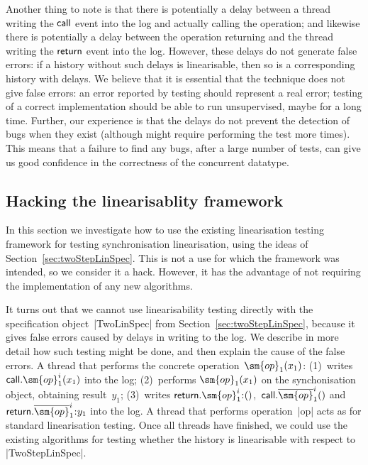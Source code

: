 Another thing to note is that there is potentially a delay between a thread
writing the $\mathsf{call}$ event into the log and actually calling the operation; and
likewise there is potentially a delay between the operation returning and the
thread writing the $\mathsf{return}$ event into the log.  However, these delays do not
generate false errors: if a history without such delays is linearisable, then
so is a corresponding history with delays.  We believe that it is essential
that the technique does not give false errors: an error reported by testing
should represent a real error; testing of a correct implementation should be
able to run unsupervised, maybe for a long time.  Further, our experience is
that the delays do not prevent the detection of bugs when they exist (although
might require performing the test more times).  This means that a failure to
find any bugs, after a large number of tests, can give us good confidence in
the correctness of the concurrent datatype.



\subsection{Hacking the linearisablity framework}
\label{ssec:testing-hacking}


In this section we investigate how to use the existing linearisation testing
framework for testing synchronisation linearisation, using the ideas of
Section~\ref{sec:twoStepLinSpec}.  This is not a use for which the framework
was intended, so we consider it a hack.  However, it has the advantage of not
requiring the implementation of any new algorithms.

It turns out that we cannot use linearisability testing directly with the
specification object~|TwoLinSpec| from Section~\ref{sec:twoStepLinSpec},
because it gives false errors caused by delays in writing to the log.  We
describe in more detail how such testing might be done, and then explain the
cause of the false errors.  A thread that performs the concrete
operation~$\sm{op}_1(x_1)$: (1)~writes $\call.\sm{op}_1^i(x_1)$ into the log;
(2)~performs $\sm{op}_1(x_1)$ on the synchonisation object, obtaining
result~$y_1$; (3)~writes $\return.\sm{op}_1^i \:: ()$,\,
$\call.\overline{\sm{op}}_1^i()$ and $\return.\overline{\sm{op}}_1^i \:: y_1$
into the log.  A thread that performs operation~|op| acts as for standard
linearisation testing.  Once all threads have finished, we could use the
existing algorithms for testing whether the history is linearisable with
respect to |TwoStepLinSpec|.

